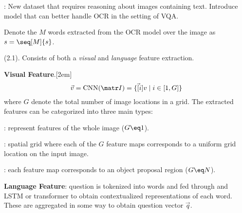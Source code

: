 \documentclass[11pt]{article}
\begin{document}

: New  dataset that requires reasoning about images containing text. Introduce  model that can better  handle OCR in the setting of VQA. 


Denote the $M$ words extracted from the OCR model over the image as $s = \seq[M]{s}$. 










 (2.1). Consists of both a \textit{visual} and \textit{language} feature extraction. 
\begin{compactitem}
	\item \textbf{Visual Feature}.[2em]
	\begin{align}
		\vec v = \text{CNN}(\matr I) = \{  \vec[i]{v} \mid i \in [1, G] \}
	\end{align}
	 where $G$ denote the total number of image locations in a grid. The extracted features can be categorized into three main types:
	 \begin{compactenum}
	 	\item {}: represent features of the whole image ($G \eq 1$). 
	 	\item {}: spatial grid where each of the $G$ feature maps corresponds to a uniform grid location on the input image.
	 	\item {}: each feature map corresponds to an object proposal region ($G \eq N$).
	 \end{compactenum}
 
 	\item \textbf{Language Feature}: question is tokenized into words and fed through and LSTM or transformer to obtain contextualized representations of each word. These are aggregated in some way to obtain question vector $\vec q$. 
\end{compactitem} 
\end{document}
